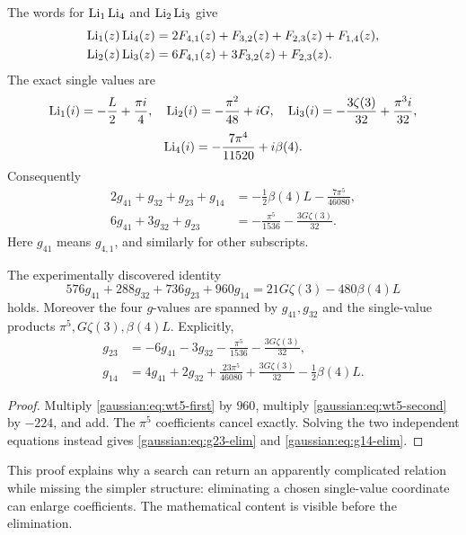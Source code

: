 The words for \(\operatorname{Li}_1\operatorname{Li}_4\) and \(\operatorname{Li}_2\operatorname{Li}_3\) give
\begin{align}
\operatorname{Li}_1(z)\operatorname{Li}_4(z)
&=2F_{4,1}(z)+F_{3,2}(z)+F_{2,3}(z)+F_{1,4}(z),
\label{gaussian:eq:shuffle14}\\
\operatorname{Li}_2(z)\operatorname{Li}_3(z)
&=6F_{4,1}(z)+3F_{3,2}(z)+F_{2,3}(z).
\label{gaussian:eq:shuffle23}
\end{align}
The exact single values are
\[
\operatorname{Li}_1(i)=-\frac L2+\frac{\pi i}{4},\quad
\operatorname{Li}_2(i)=-\frac{\pi^2}{48}+iG,\quad
\operatorname{Li}_3(i)=-\frac{3\zeta(3)}{32}+\frac{\pi^3i}{32},
\]
\[
\operatorname{Li}_4(i)=-\frac{7\pi^4}{11520}+i\beta(4).
\]
Consequently
\begin{align}
2g_{41}+g_{32}+g_{23}+g_{14}
&=-\frac12\beta(4)L-\frac{7\pi^5}{46080},
\label{gaussian:eq:wt5-first}\\
6g_{41}+3g_{32}+g_{23}
&=-\frac{\pi^5}{1536}-\frac{3G\zeta(3)}{32}.
\label{gaussian:eq:wt5-second}
\end{align}
Here \(g_{41}\) means \(g_{4,1}\), and similarly for other subscripts.

\begin{corollary}
\label{gaussian:cor:wt5}
The experimentally discovered identity
\begin{equation}\label{gauss:eq:wt5-sporadic}
576g_{41}+288g_{32}+736g_{23}+960g_{14}
=21G\zeta(3)-480\beta(4)L
\end{equation}
holds. Moreover the four \(g\)-values are spanned by \(g_{41},g_{32}\)
and the single-value products \(\pi^5,G\zeta(3),\beta(4)L\).
Explicitly,
\begin{align}
g_{23}
&=-6g_{41}-3g_{32}-\frac{\pi^5}{1536}
  -\frac{3G\zeta(3)}{32},\label{gaussian:eq:g23-elim}\\
g_{14}
&=4g_{41}+2g_{32}+\frac{23\pi^5}{46080}
  +\frac{3G\zeta(3)}{32}-\frac12\beta(4)L.
\label{gaussian:eq:g14-elim}
\end{align}
\end{corollary}

\begin{proof}
Multiply \eqref{gaussian:eq:wt5-first} by \(960\), multiply
\eqref{gaussian:eq:wt5-second} by \(-224\), and add.
The \(\pi^5\) coefficients cancel exactly. Solving the two
independent equations instead gives \eqref{gaussian:eq:g23-elim} and
\eqref{gaussian:eq:g14-elim}.
\end{proof}

This proof explains why a search can return an apparently complicated
relation while missing the simpler structure: eliminating a chosen
single-value coordinate can enlarge coefficients.
The mathematical content is visible before the elimination.

